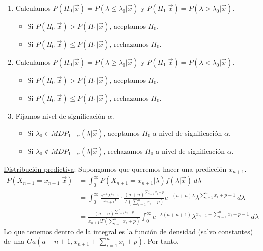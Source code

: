 \begin{enumerate}
    \item Calculamos $P(H_0 | \vec{x}) = P(\lambda \leq \lambda_0 |\vec{x})$ y $P(H_1 | \vec{x}) = P(\lambda > \lambda_0 | \vec{x})$.
    \begin{itemize}
        \item Si $P(H_0 | \vec{x}) > P(H_1 | \vec{x})$, aceptamos $H_0$.
        \item Si $P(H_0 | \vec{x}) \leq P(H_1 | \vec{x})$, rechazamos $H_0$.
    \end{itemize}
        \item Calculamos $P(H_0 | \vec{x}) = P(\lambda \ge \lambda_0 |\vec{x})$ y $P(H_1 | \vec{x}) = P(\lambda < \lambda_0 | \vec{x})$.
    \begin{itemize}
        \item Si $P(H_0 | \vec{x}) > P(H_1 | \vec{x})$, aceptamos $H_0$.
        \item Si $P(H_0 | \vec{x}) \leq P(H_1 | \vec{x})$, rechazamos $H_0$.
    \end{itemize}
    \item Fijamos nivel de significación $\alpha$.
    \begin{itemize}
        \item Si $\lambda_0 \in MDP_{1 - \alpha}(\lambda | \vec{x})$, aceptamos $H_0$ a nivel de significación $\alpha$.
        \item Si $\lambda_0 \not\in MDP_{1 - \alpha}(\lambda | \vec{x})$, rechazamos $H_0$ a nivel de significación $\alpha$.
    \end{itemize}
\end{enumerate}
\noindent \underline{Distribución predictiva}: Supongamos que queremos hacer una predicción $x_{n+1}$.
\begin{align*}
    P(X_{n+1} = x_{n+1} | \vec{x}) &= \int_{0}^{\infty} P(X_{n+1} = x_{n+1} | \lambda) f(\lambda | \vec{x}) \ d\lambda \\
    &= \int_{0}^{\infty} \frac{e^{-\lambda} \lambda^{x_{n+1}}}{x_{n+1}!} \cdot \frac{(a+n)^{\sum_{i=1}^{n} x_i + p}}{\Gamma(\sum_{i=1}^{n} x_i + p)} e^{-(a+n)\lambda}\lambda^{\sum_{i=1}^{n} x_i + p - 1} \ d\lambda \\
    &= \frac{(a+n)^{\sum_{i=1}^{n} x_i + p}}{x_{n+1}!\Gamma(\sum_{i=1}^{n} x_i + p)} \int_{0}^{\infty}  e^{-\lambda(a+n+1)}\lambda^{x_{n+1} + \sum_{i=1}^{n} x_i + p - 1} \ d\lambda
\end{align*}
Lo que tenemos dentro de la integral es la función de densidad (salvo constantes) de una \newline $Ga\left( a+n+1, x_{n+1} + \sum_{i=1}^{n} x_i + p \right)$. Por tanto, 

